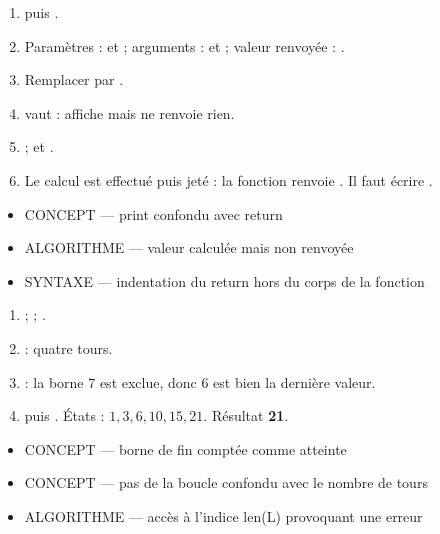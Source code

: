 \documentclass[10pt,a4paper]{article}
\begin{document}
\begin{enumerate}
\item {} puis .
\item Paramètres :  et  ; arguments :  et  ; valeur renvoyée : .
\item Remplacer  par .
\item {} vaut  :  affiche mais ne renvoie rien.
\item {} ;  et .
\item Le calcul est effectué puis jeté : la fonction renvoie . Il faut écrire .
\end{enumerate}
\begin{itemize}
\item \textsc{CONCEPT} --- print confondu avec return
\item \textsc{ALGORITHME} --- valeur calculée mais non renvoyée
\item \textsc{SYNTAXE} --- indentation du return hors du corps de la fonction
\end{itemize}
\begin{enumerate}
\item {} ;  ; .
\item {} : quatre tours.
\item {} : la borne $7$ est exclue, donc $6$ est bien la dernière valeur.
\item {} puis . États : $1, 3, 6, 10, 15, 21$. Résultat \textbf{21}.
\end{enumerate}
\begin{itemize}
\item \textsc{CONCEPT} --- borne de fin comptée comme atteinte
\item \textsc{CONCEPT} --- pas de la boucle confondu avec le nombre de tours
\item \textsc{ALGORITHME} --- accès à l'indice len(L) provoquant une erreur
\end{itemize}
\end{document}
